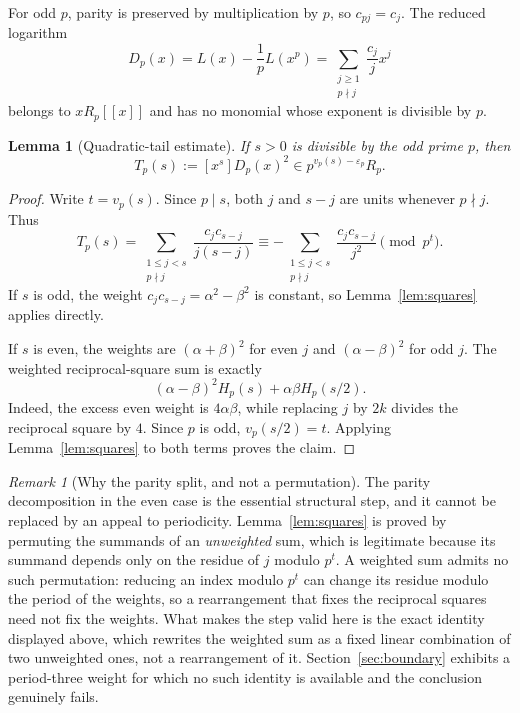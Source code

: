 \documentclass[11pt,a4paper]{article}
\numberwithin{equation}{section}
\newtheorem{lemma}[theorem]{Lemma}
\theoremstyle{definition}
\theoremstyle{remark}
\newtheorem{remark}[theorem]{Remark}
\newcommand{\eps}{\varepsilon}
\begin{document}
For odd $p$, parity is preserved by multiplication by $p$, so $c_{pj}=c_j$.
The reduced logarithm
\begin{equation}\label{eq:Dp}
 D_p(x)=L(x)-\frac1pL(x^p)
       =\sum_{\substack{j\ge1\\p\nmid j}}\frac{c_j}{j}x^j
\end{equation}
belongs to $xR_p[[x]]$ and has no monomial whose exponent is divisible by
$p$.

\begin{lemma}[Quadratic-tail estimate]\label{lem:quadratic}
If $s>0$ is divisible by the odd prime $p$, then
\begin{equation}\label{eq:Tvaluation}
 T_p(s):=[x^s]D_p(x)^2\in p^{v_p(s)-\eps_p}R_p.
\end{equation}
\end{lemma}
\begin{proof}
Write $t=v_p(s)$. Since $p\mid s$, both $j$ and $s-j$ are units whenever
$p\nmid j$. Thus
\[
 T_p(s)=\sum_{\substack{1\le j<s\\p\nmid j}}
 \frac{c_jc_{s-j}}{j(s-j)}
 \equiv-\sum_{\substack{1\le j<s\\p\nmid j}}
 \frac{c_jc_{s-j}}{j^2}\pmod{p^t}.
\]
If $s$ is odd, the weight $c_jc_{s-j}=\alpha^2-\beta^2$ is constant, so
Lemma~\ref{lem:squares} applies directly.

If $s$ is even, the weights are $(\alpha+\beta)^2$ for even $j$ and
$(\alpha-\beta)^2$ for odd $j$. The weighted reciprocal-square sum is
exactly
\[
 (\alpha-\beta)^2H_p(s)+\alpha\beta H_p(s/2).
\]
Indeed, the excess even weight is $4\alpha\beta$, while replacing $j$ by
$2k$ divides the reciprocal square by $4$. Since $p$ is odd,
$v_p(s/2)=t$. Applying Lemma~\ref{lem:squares} to both terms proves the
claim.
\end{proof}

\begin{remark}[Why the parity split, and not a permutation]
\label{rem:no-permutation}
The parity decomposition in the even case is the essential structural step,
and it cannot be replaced by an appeal to periodicity. Lemma~\ref{lem:squares}
is proved by permuting the summands of an \emph{unweighted} sum, which is
legitimate because its summand depends only on the residue of $j$ modulo
$p^t$. A weighted sum admits no such permutation: reducing an index modulo
$p^t$ can change its residue modulo the period of the weights, so a
rearrangement that fixes the reciprocal squares need not fix the weights.
What makes the step valid here is the exact identity displayed above, which
rewrites the weighted sum as a fixed linear combination of two unweighted
ones, not a rearrangement of it. Section~\ref{sec:boundary} exhibits a
period-three weight for which no such identity is available and the
conclusion genuinely fails.
\end{remark}
\end{document}

